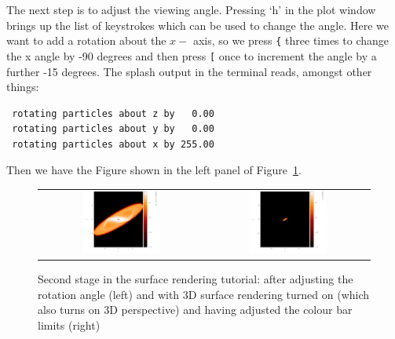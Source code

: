 \documentclass[a4paper,11pt]{article}
\begin{document}
The next step is to adjust the viewing angle. Pressing `h' in the plot window brings up the list of keystrokes which can be used to change the angle. Here we want to add a rotation about the $x-$ axis, so we press \verb+{+ three times to change the x angle by -90 degrees and then press \verb+[+ once to increment the angle by a further -15 degrees. The splash output in the terminal reads, amongst other things:
\begin{verbatim}
 rotating particles about z by   0.00
 rotating particles about y by   0.00
 rotating particles about x by 255.00
\end{verbatim}
Then we have the Figure shown in the left panel of Figure~\ref{fig:surfpart2}.
\begin{figure}[h]
\begin{center}
\begin{tabular}{cc}
\includegraphics[width=0.5\textwidth]{surfpart3.png} &
\includegraphics[width=0.5\textwidth]{surfpart4.png}
\end{tabular}
\caption{Second stage in the surface rendering tutorial: after adjusting the rotation angle (left) and with 3D surface rendering turned on (which also turns on 3D perspective) and having adjusted the colour bar limits (right)}
\label{fig:surfpart2}
\end{center}
\end{figure}
\end{document}
